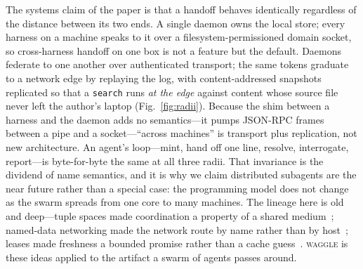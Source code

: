 \documentclass[10pt,twocolumn]{article}
\newcommand{\tok}[1]{\texttt{#1}}
\begin{document}
The systems claim of the paper is that a handoff behaves identically
regardless of the distance between its two ends. A single daemon owns the
local store; every harness on a machine speaks to it over a
filesystem-permissioned domain socket, so cross-harness handoff on one box
is not a feature but the default. Daemons federate to one another over
authenticated transport; the same tokens graduate to a network edge by
replaying the log, with content-addressed snapshots replicated so that a
\tok{search} runs \emph{at the edge} against content whose source file
never left the author's laptop (Fig.~\ref{fig:radii}). Because the shim
between a harness and the daemon adds no semantics---it pumps
JSON-RPC frames between a pipe and a socket---``across machines'' is
transport plus replication, not new architecture. An agent's loop---mint,
hand off one line, resolve, interrogate, report---is byte-for-byte the same
at all three radii. That invariance is the dividend of name semantics, and
it is why we claim distributed subagents are the near future rather than a
special case: the programming model does not change as the swarm spreads
from one core to many machines. The lineage here is old and deep---tuple
spaces made coordination a property of a shared
medium~\citep{gelernter1985}; named-data networking made the network route
by name rather than by host~\citep{jacobson2009}; leases made freshness a
bounded promise rather than a cache guess~\citep{gray1989}. \textsc{waggle}
is these ideas applied to the artifact a swarm of agents passes around.
\end{document}
